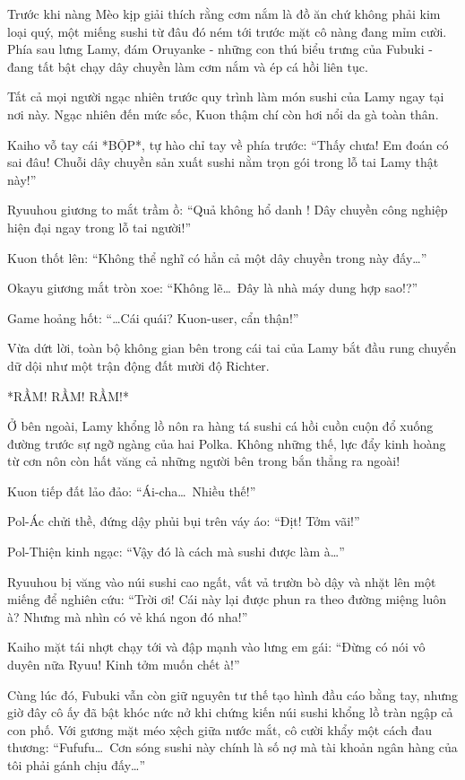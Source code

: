 \documentclass[../main.tex]{subfiles}
\begin{document}
Trước khi nàng Mèo kịp giải thích rằng cơm nắm là đồ ăn chứ không phải kim loại quý, một miếng sushi từ đâu đó ném tới trước mặt cô nàng đang mỉm cười. Phía sau lưng Lamy, đám Oruyanke - những con thú biểu trưng của Fubuki - đang tất bật chạy dây chuyền làm cơm nắm và ép cá hồi liên tục.


Tất cả mọi người ngạc nhiên trước quy trình làm món sushi của Lamy ngay tại nơi này. Ngạc nhiên đến mức sốc, Kuon thậm chí còn hơi nổi da gà toàn thân.

Kaiho vỗ tay cái *BỘP*, tự hào chỉ tay về phía trước: ``Thấy chưa! Em đoán có sai đâu! Chuỗi dây chuyền sản xuất sushi nằm trọn gói trong lỗ tai Lamy thật này!''

Ryuuhou giương to mắt trầm ồ: ``Quả không hổ danh \hll! Dây chuyền công nghiệp hiện đại ngay trong lỗ tai người!''

Kuon thốt lên: ``Không thể nghĩ có hẳn cả một dây chuyền trong này đấy\dots''

Okayu giương mắt tròn xoe: ``Không lẽ\dots\ Đây là nhà máy dung hợp sao!?''

Game hoảng hốt: ``\dots Cái quái? Kuon-user, cẩn thận!''

Vừa dứt lời, toàn bộ không gian bên trong cái tai của Lamy bắt đầu rung chuyển dữ dội như một trận động đất mười độ Richter.

*RẦM! RẦM! RẦM!*

Ở bên ngoài, Lamy khổng lồ nôn ra hàng tá sushi cá hồi cuồn cuộn đổ xuống đường trước sự ngỡ ngàng của hai Polka. Không những thế, lực đẩy kinh hoàng từ cơn nôn còn hất văng cả những người bên trong bắn thẳng ra ngoài!


Kuon tiếp đất lảo đảo: ``Ái-cha\dots\ Nhiều thế!''

Pol-Ác chửi thề, đứng dậy phủi bụi trên váy áo: ``Địt! Tởm vãi!''

Pol-Thiện kinh ngạc: ``Vậy đó là cách mà sushi được làm à\dots''

Ryuuhou bị văng vào núi sushi cao ngất, vất vả trườn bò dậy và nhặt lên một miếng để nghiên cứu: ``Trời ơi! Cái này lại được phun ra theo đường miệng luôn à? Nhưng mà nhìn có vẻ khá ngon đó nha!''

Kaiho mặt tái nhợt chạy tới và đập mạnh vào lưng em gái: ``Đừng có nói vô duyên nữa Ryuu! Kinh tởm muốn chết à!''

Cùng lúc đó, Fubuki vẫn còn giữ nguyên tư thế tạo hình đầu cáo bằng tay, nhưng giờ đây cô ấy đã bật khóc nức nở khi chứng kiến núi sushi khổng lồ tràn ngập cả con phố. Với gương mặt méo xệch giữa nước mắt, cô cười khẩy một cách đau thương: ``Fufufu\dots\ Cơn sóng sushi này chính là số nợ mà tài khoản ngân hàng của tôi phải gánh chịu đấy\dots''
\end{document}
